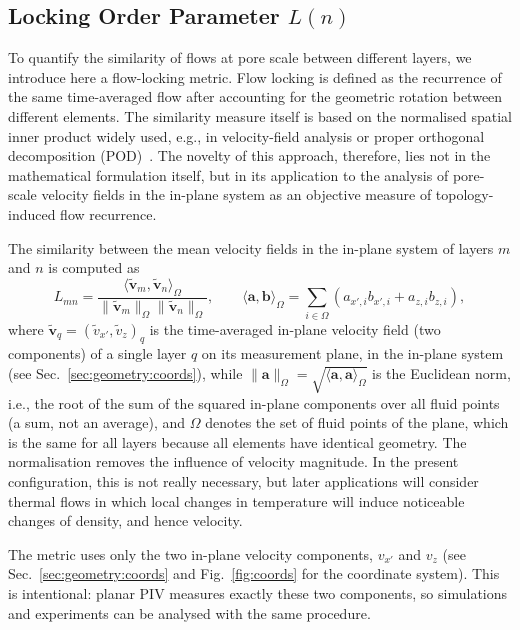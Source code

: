 \subsection{Locking Order Parameter \texorpdfstring{$L(n)$}{L(n)}}
\label{sec:locking:Ln}

To quantify the similarity of flows at pore scale between different layers, we introduce here a flow-locking metric. Flow locking is defined as the recurrence of the same time-averaged flow after accounting for the geometric rotation between different elements. The similarity measure itself is based on the normalised spatial inner product widely used, e.g., in velocity-field analysis or proper orthogonal decomposition (POD)~\cite{lumley1967,sirovich1987,berkooz1993pod}. The novelty of this approach, therefore, lies not in the mathematical formulation itself, but in its application to the analysis of pore-scale velocity fields in the in-plane system as an objective measure of topology-induced flow recurrence.

The similarity between the mean velocity fields in the in-plane system of layers $m$ and $n$ is computed as
\begin{equation}
L_{mn}
=
\frac{\langle\tilde{\bm{v}}_m,\tilde{\bm{v}}_n\rangle_{\Omega}}
{\|\tilde{\bm{v}}_m\|_{\Omega}
\|\tilde{\bm{v}}_n\|_{\Omega}},
\qquad
\langle\bm{a},\bm{b}\rangle_{\Omega}
=
\sum_{i\in\Omega}
\left(
a_{x',i} b_{x',i}
+
a_{z,i} b_{z,i}
\right),
\label{eq:Ln}
\end{equation}
where $\tilde{\bm{v}}_q=(\tilde v_{x'},\tilde v_z)_q$ is the time-averaged in-plane velocity field (two components) of a single layer $q$ on its measurement plane, in the in-plane system (see Sec.~\ref{sec:geometry:coords}), while $\|\bm a\|_\Omega=\sqrt{\langle\bm a,\bm a\rangle_\Omega}$ is the Euclidean norm, i.e., the root of the sum of the squared in-plane components over all fluid points (a sum, not an average), and $\Omega$ denotes the set of fluid points of the plane, which is the same for all layers because all elements have identical geometry. The normalisation removes the influence of velocity magnitude. In the present configuration, this is not really necessary, but later applications will consider thermal flows in which local changes in temperature will induce noticeable changes of density, and hence velocity.

The metric uses only the two in-plane velocity components, $v_{x'}$ and $v_z$ (see Sec.~\ref{sec:geometry:coords} and Fig.~\ref{fig:coords} for the coordinate system). This is intentional: planar PIV measures exactly these two components, so simulations and experiments can be analysed with the same procedure.

